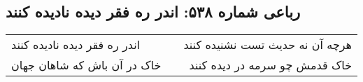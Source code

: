 \begin{center}
\section*{رباعی شماره ۵۳۸: اندر ره فقر دیده نادیده کنند}
\label{sec:0538}
\begin{longtable}{l p{0.5cm} r}
اندر ره فقر دیده نادیده کنند
&&
هرچه آن نه حدیث تست نشنیده کنند
\\
خاک در آن باش که شاهان جهان
&&
خاک قدمش چو سرمه در دیده کنند
\\
\end{longtable}
\end{center}
